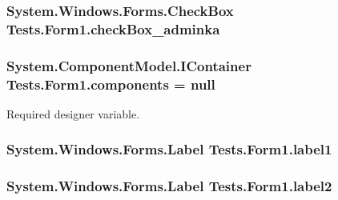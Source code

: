 \subsubsection[{\texorpdfstring{check\+Box\+\_\+adminka}{checkBox_adminka}}]{\setlength{\rightskip}{0pt plus 5cm}System.\+Windows.\+Forms.\+Check\+Box Tests.\+Form1.\+check\+Box\+\_\+adminka\hspace{0.3cm}{\ttfamily [private]}}\hypertarget{class_tests_1_1_form1_ad0eea4d9c6a082c8010281c105cc5a0e}{}\label{class_tests_1_1_form1_ad0eea4d9c6a082c8010281c105cc5a0e}
\subsubsection[{\texorpdfstring{components}{components}}]{\setlength{\rightskip}{0pt plus 5cm}System.\+Component\+Model.\+I\+Container Tests.\+Form1.\+components = null\hspace{0.3cm}{\ttfamily [private]}}\hypertarget{class_tests_1_1_form1_a98b604da06333c2647452a13c82d1266}{}\label{class_tests_1_1_form1_a98b604da06333c2647452a13c82d1266}


Required designer variable. 

\subsubsection[{\texorpdfstring{label1}{label1}}]{\setlength{\rightskip}{0pt plus 5cm}System.\+Windows.\+Forms.\+Label Tests.\+Form1.\+label1\hspace{0.3cm}{\ttfamily [private]}}\hypertarget{class_tests_1_1_form1_acfe16ee506f1ce1e06fbe474a9ddc5b6}{}\label{class_tests_1_1_form1_acfe16ee506f1ce1e06fbe474a9ddc5b6}
\subsubsection[{\texorpdfstring{label2}{label2}}]{\setlength{\rightskip}{0pt plus 5cm}System.\+Windows.\+Forms.\+Label Tests.\+Form1.\+label2\hspace{0.3cm}{\ttfamily [private]}}\hypertarget{class_tests_1_1_form1_a83300d890a80130ed98355d16b01c06b}{}\label{class_tests_1_1_form1_a83300d890a80130ed98355d16b01c06b}
